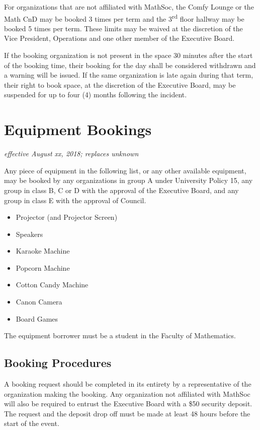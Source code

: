 For organizations that are not affiliated with MathSoc, the Comfy Lounge or the
Math CnD may be booked 3 times per term and the 3\textsuperscript{rd} floor
hallway may be booked 5 times per term. These limits may be waived at the
discretion of the Vice President, Operations and one other member of the
Executive Board.

If the booking organization is not present in the space 30 minutes after the
start of the booking time, their booking for the day shall be considered
withdrawn and a warning will be issued. If the same organization is late again
during that term, their right to book space, at the discretion of the Executive
Board, may be suspended for up to four (4) months following the incident.

\section{Equipment Bookings}
\emph{effective August xx, 2018; replaces unknown}

Any piece of equipment in the following list, or any other available equipment,
may be booked by any organizations in group A under University Policy 15, any
group in class B, C or D with the approval of the Executive Board, and any
group in class E with the approval of Council.

\begin{itemize}
  \item Projector (and Projector Screen)
  \item Speakers
  \item Karaoke Machine
  \item Popcorn Machine
  \item Cotton Candy Machine
  \item Canon Camera
  \item Board Games
\end{itemize}

The equipment borrower must be a student in the Faculty of Mathematics.

\subsection{Booking Procedures}

A booking request should be completed in its entirety by a
representative of the organization making the booking. Any organization not
affiliated with MathSoc will also be required to entrust the Executive Board
with a \$50 security deposit. The request and the deposit drop off must be made
at least 48 hours before the start of the event.

